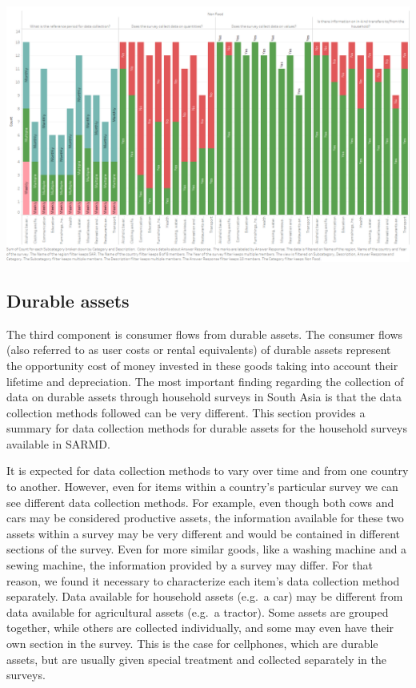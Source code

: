 \documentclass[13 pt,]{book}
\begin{document}
\href{https://tab.worldbank.org/\#/site/WBG/views/SAR_MNA_Metadata/NonFood}{\includegraphics{figures/Nonfood.png}}

\subsection{Durable assets}\label{durable-assets}

The third component is consumer flows from durable assets. The consumer
flows (also referred to as user costs or rental equivalents) of durable
assets represent the opportunity cost of money invested in these goods
taking into account their lifetime and depreciation. The most important
finding regarding the collection of data on durable assets through
household surveys in South Asia is that the data collection methods
followed can be very different. This section provides a summary for data
collection methods for durable assets for the household surveys
available in SARMD.

It is expected for data collection methods to vary over time and from
one country to another. However, even for items within a country's
particular survey we can see different data collection methods. For
example, even though both cows and cars may be considered productive
assets, the information available for these two assets within a survey
may be very different and would be contained in different sections of
the survey. Even for more similar goods, like a washing machine and a
sewing machine, the information provided by a survey may differ. For
that reason, we found it necessary to characterize each item's data
collection method separately. Data available for household assets
(e.g.~a car) may be different from data available for agricultural
assets (e.g.~a tractor). Some assets are grouped together, while others
are collected individually, and some may even have their own section in
the survey. This is the case for cellphones, which are durable assets,
but are usually given special treatment and collected separately in the
surveys.
\end{document}
